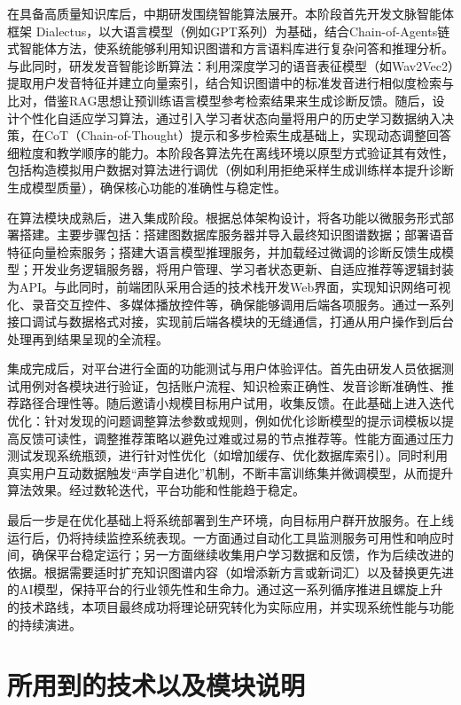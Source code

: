 在具备高质量知识库后，中期研发围绕智能算法展开。本阶段首先开发文脉智能体框架 Dialectus，以大语言模型（例如GPT系列）为基础，结合Chain-of-Agents链式智能体方法，使系统能够利用知识图谱和方言语料库进行复杂问答和推理分析。与此同时，研发发音智能诊断算法：利用深度学习的语音表征模型（如Wav2Vec2）提取用户发音特征并建立向量索引，结合知识图谱中的标准发音进行相似度检索与比对，借鉴RAG思想让预训练语言模型参考检索结果来生成诊断反馈。随后，设计个性化自适应学习算法，通过引入学习者状态向量将用户的历史学习数据纳入决策，在CoT（Chain-of-Thought）提示和多步检索生成基础上，实现动态调整回答细粒度和教学顺序的能力。本阶段各算法先在离线环境以原型方式验证其有效性，包括构造模拟用户数据对算法进行调优（例如利用拒绝采样生成训练样本提升诊断生成模型质量），确保核心功能的准确性与稳定性。

在算法模块成熟后，进入集成阶段。根据总体架构设计，将各功能以微服务形式部署搭建。主要步骤包括：搭建图数据库服务器并导入最终知识图谱数据；部署语音特征向量检索服务；搭建大语言模型推理服务，并加载经过微调的诊断反馈生成模型；开发业务逻辑服务器，将用户管理、学习者状态更新、自适应推荐等逻辑封装为API。与此同时，前端团队采用合适的技术栈开发Web界面，实现知识网络可视化、录音交互控件、多媒体播放控件等，确保能够调用后端各项服务。通过一系列接口调试与数据格式对接，实现前后端各模块的无缝通信，打通从用户操作到后台处理再到结果呈现的全流程。

集成完成后，对平台进行全面的功能测试与用户体验评估。首先由研发人员依据测试用例对各模块进行验证，包括账户流程、知识检索正确性、发音诊断准确性、推荐路径合理性等。随后邀请小规模目标用户试用，收集反馈。在此基础上进入迭代优化：针对发现的问题调整算法参数或规则，例如优化诊断模型的提示词模板以提高反馈可读性，调整推荐策略以避免过难或过易的节点推荐等。性能方面通过压力测试发现系统瓶颈，进行针对性优化（如增加缓存、优化数据库索引）。同时利用真实用户互动数据触发“声学自进化”机制，不断丰富训练集并微调模型，从而提升算法效果。经过数轮迭代，平台功能和性能趋于稳定。

最后一步是在优化基础上将系统部署到生产环境，向目标用户群开放服务。在上线运行后，仍将持续监控系统表现。一方面通过自动化工具监测服务可用性和响应时间，确保平台稳定运行；另一方面继续收集用户学习数据和反馈，作为后续改进的依据。根据需要适时扩充知识图谱内容（如增添新方言或新词汇）以及替换更先进的AI模型，保持平台的行业领先性和生命力。通过这一系列循序推进且螺旋上升的技术路线，本项目最终成功将理论研究转化为实际应用，并实现系统性能与功能的持续演进。

\section{所用到的技术以及模块说明}
